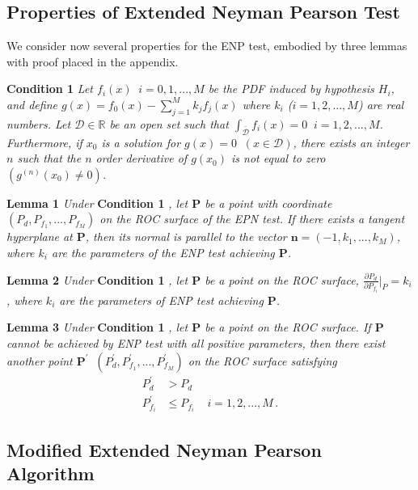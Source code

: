 \documentclass[12pt,journal,a4paper,twoside,onecolumn]{IEEEtran}
\begin{document}
\begin{spacing}{2.5}
\subsection{Properties of Extended Neyman Pearson Test}
We consider now several properties for the ENP test, embodied by three lemmas with proof placed in the appendix.

\noindent \textbf{Condition 1}
\textit{
\noindent Let $f_i(x) \;\;i=0, 1, ..., M$ be the PDF induced by hypothesis $H_i$, and define $g(x) = f_0(x) - \sum_{j=1}^{M} k_jf_j(x)$ where $k_i$  ($i = 1, 2, ..., M$) are real numbers. Let $\mathcal{D} \in \mathbb{R}$ be an open set such that $\int_{\bar{\mathcal{D}}}f_i(x)=0\;\;i = 1, 2, ..., M$. Furthermore,  if $x_0$ is a solution  for $g(x) = 0 \;\;(x \in \mathcal{D})$, there exists an integer $n$ such that  the $n$ order derivative of $g(x_0)$ is not equal to zero $(g^{(n)}(x_0) \neq 0)$.
}

\noindent \textbf{Lemma 1}
\textit{
\noindent Under}
\textbf{Condition 1}
\textit{, let $\mathbf{P}$ be a point with coordinate $(P_d, P_{f_1}, ..., P_{f_M})$ on the ROC surface of the EPN test. If there exists a tangent hyperplane at $\mathbf{P}$, then its normal is parallel to the vector $\mathbf{n} = (-1, k_1, ..., k_M)$, where $k_i$ are the parameters of the ENP test achieving $\mathbf{P}$.
}

\noindent \textbf{Lemma 2}
\textit{
\noindent
Under}
\textbf{Condition 1}
\textit{, let $\mathbf{P}$ be a point on the ROC surface, $\frac{\partial P_d}{\partial P_{f_i}} \bigg|_P = k_i$, where $k_i$ are the parameters of ENP test achieving $\mathbf{P}$.
}

\noindent \textbf{Lemma 3}
\textit{
\noindent
Under}
\textbf{Condition 1}
\textit{, let $\mathbf{P}$ be a point on the ROC surface. If  $\mathbf{P}$ cannot be achieved by ENP test with all positive parameters, then there  exist another point $\mathbf{P}^\prime\;\; (P_d^\prime, P_{f_1}^\prime, ..., P_{f_M}^\prime)$ on the ROC surface satisfying
}
\begin{equation}
  \label{equ: lemma 3 equation}
  \begin{split}
    P_d^\prime &> P_d\\
    P_{f_i}^\prime &\leq P_{f_i}\;\;\;\;i = 1, 2, ..., M\,.
  \end{split}
\end{equation}

\subsection{Modified Extended Neyman Pearson Algorithm}



\end{spacing}
\end{document}
